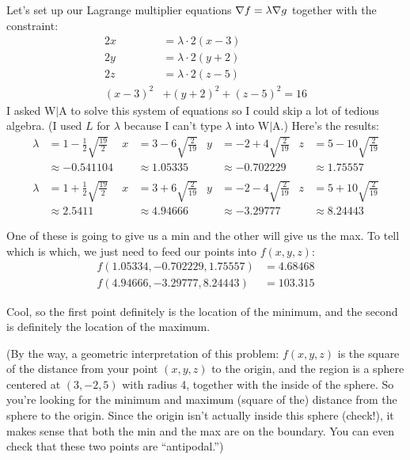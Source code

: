 \begin{enumerate}[leftmargin=0pt]
\begin{red}
Let's set up our Lagrange multiplier equations $\nabla f = \lambda \nabla g$ together with the constraint:
\begin{align*}
    2x &= \lambda\cdot 2(x-3) \\
    2y &= \lambda \cdot 2(y+2) \\
    2z &= \lambda \cdot 2(z-5) \\
    (x-3)^2 &+ (y+2)^2 + (z-5)^2 = 16
\end{align*}
I asked W$|$A to solve this system of equations so I could skip a lot of tedious algebra. (I used $L$ for $\lambda$ because I can't type $\lambda$ into W$|$A.) Here's the results:
\begin{align*}
    \lambda &= 1 -\frac{1}{2}\sqrt{\frac{19}{2}} &
    x &= 3 - 6 \sqrt{\frac{2}{19}} &
    y &= -2 + 4 \sqrt{\frac{2}{19}} &
    z &= 5 - 10 \sqrt{\frac{2}{19}} \\
    &\approx -0.541104 &
    &\approx 1.05335 &
    &\approx -0.702229 &
    &\approx 1.75557 \\
    &&&&&&&\\
    \lambda &= 1 +\frac{1}{2}\sqrt{\frac{19}{2}} &
    x &= 3 + 6 \sqrt{\frac{2}{19}} &
    y &= -2 - 4 \sqrt{\frac{2}{19}} &
    z &= 5 + 10 \sqrt{\frac{2}{19}} \\
    &\approx 2.5411 &
    &\approx 4.94666 &
    &\approx -3.29777 &
    &\approx 8.24443
\end{align*}

One of these is going to give us a min and the other will give us the max. To tell which is which, we just need to feed our points into $f(x,y,z)$:
\begin{align*}
    f(1.05334, -0.702229, 1.75557) &= 4.68468 \\
    f(4.94666, -3.29777, 8.24443) &= 103.315
\end{align*}

Cool, so the first point definitely is the location of the minimum, and the second is definitely the location of the maximum.

(By the way, a geometric interpretation of this problem: $f(x,y,z)$ is the square of the distance from your point $(x,y,z)$ to the origin, and the region is a sphere centered at $(3, -2, 5)$ with radius 4, together with the inside of the sphere. So you're looking for the minimum and maximum (square of the) distance from the sphere to the origin. Since the origin isn't actually inside this sphere (check!), it makes sense that both the min and the max are on the boundary. You can even check that these two points are ``antipodal.'')
\end{red}

\end{enumerate}

